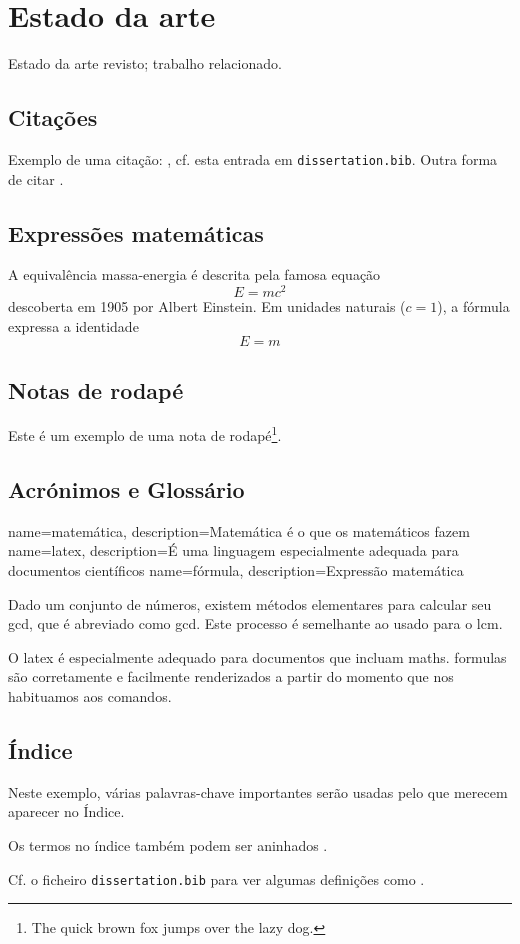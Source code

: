 \chapter{Estado da arte}

Estado da arte revisto; trabalho relacionado.

\section{Citações}
Exemplo de uma citação: \cite{GRM97}, cf. esta entrada em \texttt{dissertation.bib}.
Outra forma de citar \citep{KeR88}.

\section{Expressões matemáticas}
A equivalência massa-energia é descrita pela famosa equação
\begin{equation}
E=mc^2
\end{equation}
descoberta em 1905 por Albert Einstein.
Em unidades naturais ($c = 1$), a fórmula expressa a identidade
\[
E=m
\]

\section{Notas de rodapé}
Este é um exemplo de uma nota de rodapé\footnote{The quick brown fox jumps over the lazy dog.}.

\section{Acrónimos e Glossário}
{
    name=matemática,
    description={Matemática é o que os matemáticos fazem}
}
{
    name=latex,
    description={É uma linguagem especialmente adequada para
documentos científicos}
}
{
    name=fórmula,
    description={Expressão matemática}
}

Dado um conjunto de números, existem métodos elementares para calcular
seu \acrlong{gcd}, que é abreviado como \acrshort{gcd}. Este processo
é semelhante ao usado para o \acrfull{lcm}.

O \Gls{latex} é especialmente adequado
para documentos que incluam \gls{maths}. \Glspl{formula} são corretamente e facilmente renderizados a partir do momento que nos habituamos aos comandos.

\section{Índice}

Neste exemplo, várias palavras-chave importantes serão usadas pelo que merecem aparecer no Índice.

Os termos no índice também podem ser aninhados .

Cf. o ficheiro \texttt{dissertation.bib} para ver algumas definições como .
